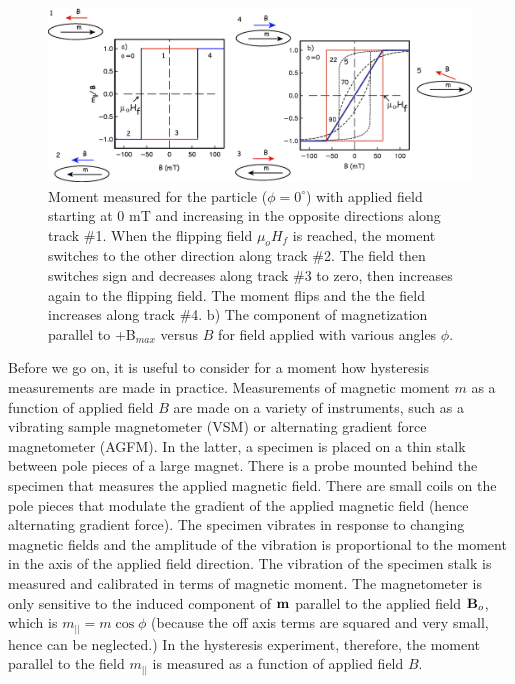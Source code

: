 \begin{figure}[h!tb]
\centering  \includegraphics[width=14 cm]{EPSfiles/outerloop.eps}
\caption{ Moment measured for the particle ($\phi=0^{\circ}$) with applied field starting at 0 mT and increasing in the opposite directions along track \#1.  When the flipping field $\mu_oH_f$ is reached, the moment switches to the other direction along track \#2.  The field then switches sign and decreases along track \#3 to zero, then increases again to the flipping field.  The moment flips and the the field increases along track \#4. b) The component of magnetization  parallel to +B$_{max}$ versus $B$ for field applied with various angles $\phi$.  }
\label{fig:outerloop}
\end{figure}




Before we go on, it is useful to consider for a moment how 
hysteresis measurements are made in practice.  
Measurements of magnetic moment $m$ as a function of applied field $B$ are made on a variety of instruments, such as a 
vibrating sample magnetometer (VSM) or alternating gradient force magnetometer (AGFM).  In the latter, a specimen is placed on a thin stalk between pole pieces of a large magnet.  There is a probe mounted  behind the specimen that measures the applied magnetic field.  There are small coils on the pole pieces that modulate the gradient of the applied magnetic field (hence alternating gradient force).   The specimen vibrates in response to changing magnetic fields and the amplitude of the vibration is proportional to the moment in the axis of the applied field direction.   The vibration of the specimen stalk is measured and calibrated in terms of magnetic moment.  The magnetometer is only sensitive to the
induced 
component of $\hbox{\bf m}$ parallel to the applied field $\hbox{\bf B}_o$, which is  $m_{||}= m \cos \phi$ (because the off axis terms are squared and very small, hence can be neglected.) 
In the hysteresis experiment, therefore,  the moment parallel to the field $m_{||}$ is measured as a function of applied field $B$.  


